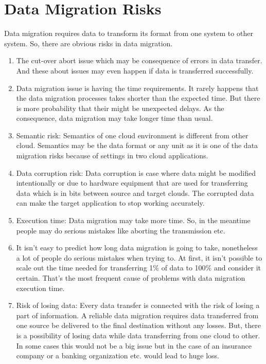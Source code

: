 \documentclass[11pt, pdftex, conference]{IEEEtran}
\begin{document}
\section{\textbf{Data Migration Risks}}
\hspace{10mm}Data migration requires data to transform its format from one system to other system. So, there are obvious risks in data migration\cite{16}.
\begin{enumerate}
\item The cut-over abort issue which may be consequence of errors in data transfer. And these about issues may even happen if data is transferred successfully.
\item Data migration issue is having the time requirements. It rarely happens that the data migration processes takes shorter than the expected time. But there is more probability that their might be unexpected delays. As the consequence, data migration may take longer time than usual.	
\item Semantic risk: Semantics of one cloud environment is different from other cloud. Semantics may be the data format or any unit as it is one of the data migration risks because of settings in two cloud applications.
\item Data corruption risk: Data corruption is case where data might be modified intentionally or due to hardware equipment that are used for transferring data which is in bits between source and target clouds. The corrupted data can make the target application to stop working accurately. 
\item Execution time: Data migration may take more time. So, in the meantime people may do serious mistakes like aborting the transmission etc. 
\item It isn't easy to predict how long data migration is going to take, nonetheless a lot of people do serious mistakes when trying to. At first, it isn't possible to scale out the time needed for transferring 1\% of data to 100\% and consider it certain. That's the most frequent cause of problems with data migration execution time.
\item Risk of losing data: Every data transfer is connected with the risk of losing a part of information. A reliable data migration requires data transferred from one source be delivered to the final destination without any losses. But, there is a possibility of losing data while data transferring from one cloud to other. In some cases this would not be a big issue but in the case of an insurance company or a banking organization etc. would lead to huge loss.

\end{enumerate}
\end{document}
